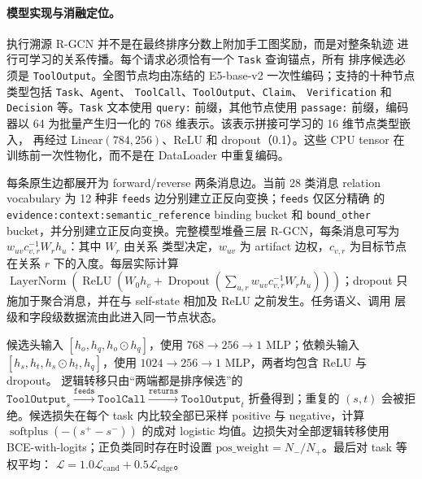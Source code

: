 \paragraph{模型实现与消融定位。}
执行溯源 R-GCN 并不是在最终排序分数上附加手工图奖励，而是对整条轨迹
进行可学习的关系传播。每个请求必须恰有一个 \texttt{Task} 查询锚点，所有
排序候选必须是 \texttt{ToolOutput}。全图节点均由冻结的 E5-base-v2
一次性编码；支持的十种节点类型包括 \texttt{Task}、\texttt{Agent}、
\texttt{ToolCall}、\texttt{ToolOutput}、\texttt{Claim}、
\texttt{Verification} 和 \texttt{Decision} 等。\texttt{Task} 文本使用
\texttt{query:} 前缀，其他节点使用 \texttt{passage:} 前缀，编码器以 64
为批量产生归一化的 768 维表示。该表示拼接可学习的 16 维节点类型嵌入，
再经过 Linear$(784,256)$、ReLU 和 dropout（0.1）。这些 CPU tensor 在
训练前一次性物化，而不是在 DataLoader 中重复编码。

每条原生边都展开为 forward/reverse 两条消息边。当前 28 类消息 relation
vocabulary 为 12 种非 \texttt{feeds} 边分别建立正反向变换；\texttt{feeds}
仅区分精确
的 \texttt{evidence:context:semantic\_reference} binding bucket 和
\texttt{bound\_other} bucket，并分别建立正反向变换。完整模型堆叠三层
R-GCN，每条消息可写为 $w_{uv}c_{v,r}^{-1}W_rh_u$：其中 $W_r$ 由关系
类型决定，$w_{uv}$ 为 artifact 边权，$c_{v,r}$ 为目标节点在关系 $r$
下的入度。每层实际计算
$\operatorname{LayerNorm}(\operatorname{ReLU}(W_0h_v+
\operatorname{Dropout}(\sum_{u,r}w_{uv}c_{v,r}^{-1}W_rh_u)))$；dropout
只施加于聚合消息，并在与 self-state 相加及 ReLU 之前发生。任务语义、调用
层级和字段级数据流由此进入同一节点状态。

候选头输入 $[h_o,h_q,h_o\odot h_q]$，使用
$768\rightarrow256\rightarrow1$ MLP；依赖头输入
$[h_s,h_t,h_s\odot h_t,h_q]$，使用
$1024\rightarrow256\rightarrow1$ MLP，两者均包含 ReLU 与 dropout。
逻辑转移只由“两端都是排序候选”的
$\texttt{ToolOutput}_s\xrightarrow{\texttt{feeds}}\texttt{ToolCall}
\xrightarrow{\texttt{returns}}\texttt{ToolOutput}_t$ 折叠得到；重复的
$(s,t)$ 会被拒绝。候选损失在每个 task 内比较全部已采样 positive 与
negative，计算 $\operatorname{softplus}(-(s^+-s^-))$ 的成对 logistic
均值。边损失对全部逻辑转移使用 BCE-with-logits；正负类同时存在时设置
$\mathrm{pos\_weight}=N_-/N_+$。最后对 task 等权平均：
$\mathcal{L}=1.0\mathcal{L}_{\mathrm{cand}}+0.5\mathcal{L}_{\mathrm{edge}}$。

